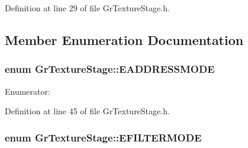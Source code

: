 \begin{CompactItemize}
Definition at line 29 of file GrTextureStage.h.

\subsection{Member Enumeration Documentation}
\hypertarget{class_gr_texture_stage_dea63364bc3369d0cf5ef74b76268d0e}{
\subsubsection[{EADDRESSMODE}]{\setlength{\rightskip}{0pt plus 5cm}enum {\bf GrTextureStage::EADDRESSMODE}}}
\label{class_gr_texture_stage_dea63364bc3369d0cf5ef74b76268d0e}


\begin{Desc}
\item[Enumerator: ]\par
\begin{description}
\item[{\em 
\hypertarget{class_gr_texture_stage_dea63364bc3369d0cf5ef74b76268d0e74df555bc49f7e73a5892485ae1e8cc7}{
EAM\_\-REPEAT}
\label{class_gr_texture_stage_dea63364bc3369d0cf5ef74b76268d0e74df555bc49f7e73a5892485ae1e8cc7}
}]\item[{\em 
\hypertarget{class_gr_texture_stage_dea63364bc3369d0cf5ef74b76268d0e59142b13ea84cd62f7609132ada3b380}{
EAM\_\-CLAMP}
\label{class_gr_texture_stage_dea63364bc3369d0cf5ef74b76268d0e59142b13ea84cd62f7609132ada3b380}
}]\end{description}
\end{Desc}



Definition at line 45 of file GrTextureStage.h.\hypertarget{class_gr_texture_stage_b86144a2e97311bb975db7c2c361f048}{
\subsubsection[{EFILTERMODE}]{\setlength{\rightskip}{0pt plus 5cm}enum {\bf GrTextureStage::EFILTERMODE}}}
\label{class_gr_texture_stage_b86144a2e97311bb975db7c2c361f048}



\end{CompactItemize}
